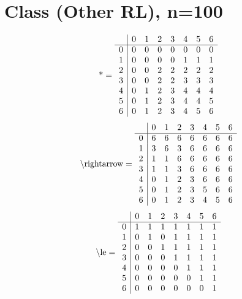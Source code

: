 \documentclass[11pt]{article}
\begin{document}
\section{Class (Other RL), n=100}
\[\text{*} = 
\begin{array}{r | r r r r r r r}
 & 0 & 1 & 2 & 3 & 4 & 5 & 6 \\ \hline
0 & 0 & 0 & 0 & 0 & 0 & 0 & 0 \\
1 & 0 & 0 & 0 & 0 & 1 & 1 & 1 \\
2 & 0 & 0 & 2 & 2 & 2 & 2 & 2 \\
3 & 0 & 0 & 2 & 2 & 3 & 3 & 3 \\
4 & 0 & 1 & 2 & 3 & 4 & 4 & 4 \\
5 & 0 & 1 & 2 & 3 & 4 & 4 & 5 \\
6 & 0 & 1 & 2 & 3 & 4 & 5 & 6 \\
\end{array}
\]
\[\text{\textbackslash rightarrow} = 
\begin{array}{r | r r r r r r r}
 & 0 & 1 & 2 & 3 & 4 & 5 & 6 \\ \hline
0 & 6 & 6 & 6 & 6 & 6 & 6 & 6 \\
1 & 3 & 6 & 3 & 6 & 6 & 6 & 6 \\
2 & 1 & 1 & 6 & 6 & 6 & 6 & 6 \\
3 & 1 & 1 & 3 & 6 & 6 & 6 & 6 \\
4 & 0 & 1 & 2 & 3 & 6 & 6 & 6 \\
5 & 0 & 1 & 2 & 3 & 5 & 6 & 6 \\
6 & 0 & 1 & 2 & 3 & 4 & 5 & 6 \\
\end{array}
\]
\[\text{\textbackslash le} = 
\begin{array}{r | r r r r r r r}
 & 0 & 1 & 2 & 3 & 4 & 5 & 6 \\ \hline
0 & 1 & 1 & 1 & 1 & 1 & 1 & 1 \\
1 & 0 & 1 & 0 & 1 & 1 & 1 & 1 \\
2 & 0 & 0 & 1 & 1 & 1 & 1 & 1 \\
3 & 0 & 0 & 0 & 1 & 1 & 1 & 1 \\
4 & 0 & 0 & 0 & 0 & 1 & 1 & 1 \\
5 & 0 & 0 & 0 & 0 & 0 & 1 & 1 \\
6 & 0 & 0 & 0 & 0 & 0 & 0 & 1 \\
\end{array}
\]
\end{document}
